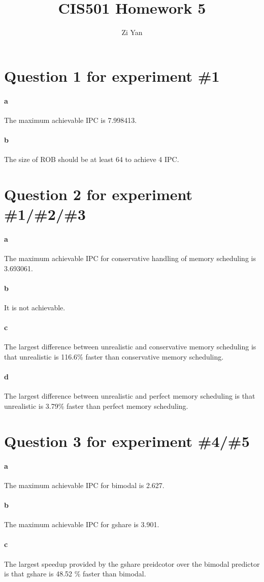 \documentclass[12pt,letterpaper]{article}
\author{Zi Yan}
\date{}
\title{CIS501 Homework 5}
\begin{document}
\maketitle

\section*{Question 1 for experiment \#1}
\paragraph*{a}
The maximum achievable IPC is 7.998413.
\paragraph*{b}
The size of ROB should be at least 64 to
achieve 4 IPC.

\section*{Question 2 for experiment \#1/\#2/\#3}
\paragraph*{a}
The maximum achievable IPC for conservative handling of memory scheduling is 3.693061.
\paragraph*{b}
It is not achievable.

\paragraph*{c}
The largest difference between unrealistic
and conservative memory scheduling is 
that unrealistic is 116.6\% faster than 
conservative memory scheduling.

\paragraph*{d}
The largest difference between unrealistic
and perfect memory scheduling is that
unrealistic is 3.79\% faster than perfect 
memory scheduling.

\section*{Question 3 for experiment \#4/\#5}
\paragraph*{a}
The maximum achievable IPC for bimodal
is 2.627.
\paragraph*{b}
The maximum achievable IPC for gshare
is 3.901.
\paragraph*{c}
The largest speedup provided by the 
gshare preidcotor over the bimodal 
predictor is that gshare is 48.52 \% faster
than bimodal.
\end{document}
